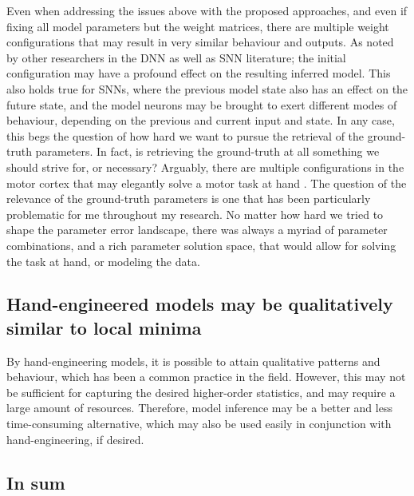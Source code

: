 \documentclass[mphil,deptreport,ianc]{infthesis} %
\begin{document}
Even when addressing the issues above with the proposed approaches, and even if fixing all model parameters but the weight matrices, there are multiple weight configurations that may result in very similar behaviour and outputs.
As noted by other researchers in the DNN as well as SNN literature; the initial configuration may have a profound effect on the resulting inferred model. 
This also holds true for SNNs, where the previous model state also has an effect on the future state, and the model neurons may be brought to exert different modes of behaviour, depending on the previous and current input and state.
In any case, this begs the question of how hard we want to pursue the retrieval of the ground-truth parameters. 
In fact, is retrieving the ground-truth at all something we should strive for, or necessary?
Arguably, there are multiple configurations in the motor cortex that may elegantly solve a motor task at hand \cite{Marblestone2016}.
The question of the relevance of the ground-truth parameters is one that has been particularly problematic for me throughout my research. No matter how hard we tried to shape the parameter error landscape, there was always a myriad of parameter combinations, and a rich parameter solution space, that would allow for solving the task at hand, or modeling the data.


\subsection*{Hand-engineered models may be qualitatively similar to local minima}

By hand-engineering models, it is possible to attain qualitative patterns and behaviour, which has been a common practice in the field. 
However, this may not be sufficient for capturing the desired higher-order statistics, and may require a large amount of resources. 
Therefore, model inference may be a better and less time-consuming alternative, which may also be used easily in conjunction with hand-engineering, if desired. 


\subsection*{In sum}
\end{document}

